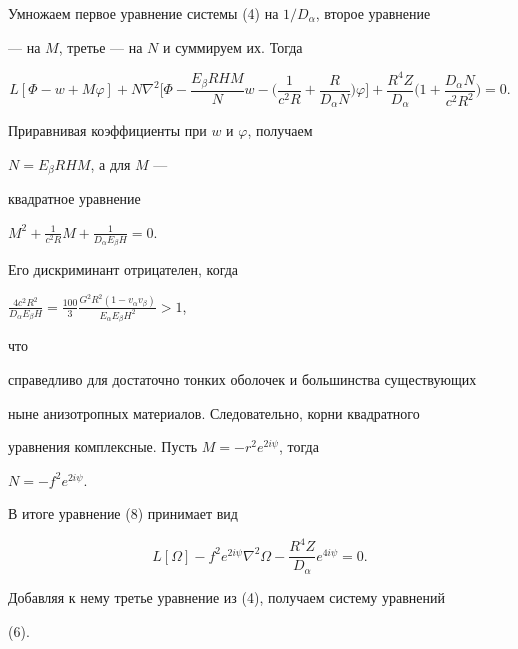 


\begin{pf} 


Умножаем первое уравнение системы (4) на $1/D_\alpha$, второе уравнение 


--- на $M$, третье --- на $N$ и суммируем их. Тогда


\begin{equation} 


L[\Phi-w+M\varphi]+N\nabla^2\bigg[\Phi- 


\frac{E_\beta R H M}{N}w-\bigg(\frac{1}{c^2R}+ 


\frac{R}{D_\alpha N}\bigg)\varphi\bigg]+\frac{R^4Z}{D_\alpha} 


\bigg(1+\frac{D_\alpha N}{c^2R^2}\bigg)=0. 


\end{equation} 


 


Приравнивая коэффициенты при $w$ и $\varphi$, получаем 


$N=E_\beta R H M$, а для $M$ --- 


квадратное уравнение 


$M^2+\frac{1}{c^2R}M+\frac{1}{D_\alpha E_\beta H}=0$. 


Его дискриминант отрицателен, когда 


$\frac{4c^2R^2}{D_\alpha E_\beta H}=\frac{100}{3} 


\frac{G^2R^2(1-v_\alpha v_\beta)}{E_\alpha E_\beta H^2}>1$, 


что 


справедливо для достаточно тонких оболочек и большинства существующих 


ныне анизотропных материалов. Следовательно, корни квадратного 


уравнения комплексные. Пусть $M=-r^2e^{2i\psi}$, тогда 


$N=-f^2e^{2i\psi}$. 


 


В итоге уравнение (8) принимает вид 


$$ 


L[\Omega]-f^2e^{2i\psi}\nabla^2\Omega- 


\frac{R^4Z}{D_\alpha}e^{4i\psi}=0. 


$$ 


Добавляя к нему третье уравнение из (4), получаем систему уравнений 


(6). 



\end{pf}
